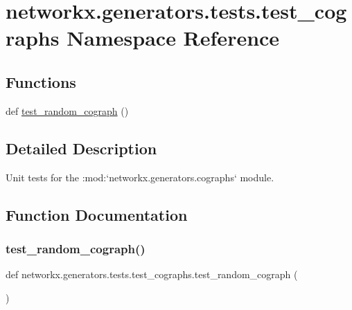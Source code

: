 \hypertarget{namespacenetworkx_1_1generators_1_1tests_1_1test__cographs}{}\section{networkx.\+generators.\+tests.\+test\+\_\+cographs Namespace Reference}
\label{namespacenetworkx_1_1generators_1_1tests_1_1test__cographs}
\subsection*{Functions}
\begin{DoxyCompactItemize}
\item 
def \hyperlink{namespacenetworkx_1_1generators_1_1tests_1_1test__cographs_a632d060df86d196f68cec586343fdb9c}{test\+\_\+random\+\_\+cograph} ()
\end{DoxyCompactItemize}


\subsection{Detailed Description}
\begin{DoxyVerb}Unit tests for the :mod:`networkx.generators.cographs` module.\end{DoxyVerb}
 

\subsection{Function Documentation}
\mbox{\label{namespacenetworkx_1_1generators_1_1tests_1_1test__cographs_a632d060df86d196f68cec586343fdb9c}} 
\subsubsection{\texorpdfstring{test\+\_\+random\+\_\+cograph()}{test\_random\_cograph()}}
{\footnotesize\ttfamily def networkx.\+generators.\+tests.\+test\+\_\+cographs.\+test\+\_\+random\+\_\+cograph (\begin{DoxyParamCaption}{ }\end{DoxyParamCaption})}

